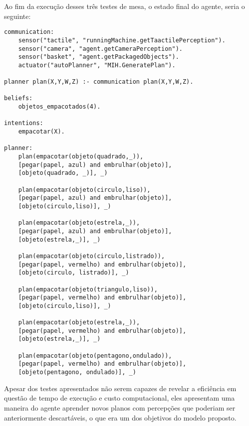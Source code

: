 Ao fim da execução desses três testes de mesa, o estado final do agente, seria o seguinte:

\begin{lstlisting}[caption={Estado final do agente Sigon.},label={list:total}]
communication:
    sensor("tactile", "runningMachine.getTaactilePerception").
    sensor("camera", "agent.getCameraPerception").
    sensor("basket", "agent.getPackagedObjects").
    actuator("autoPlanner", "MIH.GeneratePlan").

planner plan(X,Y,W,Z) :- communication plan(X,Y,W,Z).

beliefs:
    objetos_empacotados(4).
    
intentions:
	empacotar(X).

planner:
	plan(empacotar(objeto(quadrado,_)),
	[pegar(papel, azul) and embrulhar(objeto)],
	[objeto(quadrado, _)], _)

	plan(empacotar(objeto(circulo,liso)),
	[pegar(papel, azul) and embrulhar(objeto)],
	[objeto(circulo,liso)], _)

	plan(empacotar(objeto(estrela,_)),
	[pegar(papel, azul) and embrulhar(objeto)],
	[objeto(estrela,_)], _)

	plan(empacotar(objeto(circulo,listrado)),
	[pegar(papel, vermelho) and embrulhar(objeto)],
	[objeto(circulo, listrado)], _)

	plan(empacotar(objeto(triangulo,liso)),
	[pegar(papel, vermelho) and embrulhar(objeto)],
	[objeto(circulo,liso)], _)

	plan(empacotar(objeto(estrela,_)),
	[pegar(papel, vermelho) and embrulhar(objeto)],
	[objeto(estrela,_)], _)
    
    plan(empacotar(objeto(pentagono,ondulado)),
	[pegar(papel, vermelho) and embrulhar(objeto)],
    [objeto(pentagono, ondulado)], _)
\end{lstlisting}

Apesar dos testes apresentados não serem capazes de revelar a eficiência em questão de tempo de execução e custo computacional, eles apresentam uma maneira do agente aprender novos planos com percepções que poderiam ser anteriormente descartáveis, o que era um dos objetivos do modelo proposto.